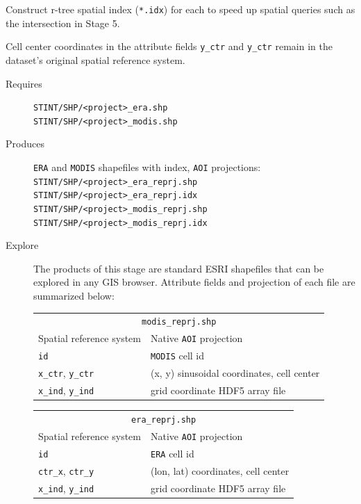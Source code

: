 \documentclass[twoside,a4paper]{refart}
\begin{document}
Construct r-tree spatial index (\texttt{*.idx}) for each to speed up spatial queries such as the intersection in Stage 5.

Cell center coordinates in the attribute fields \texttt{y\_ctr} and \texttt{y\_ctr} remain in the dataset's original spatial reference system.

  \begin{description}
    \item [Requires]
      \texttt{STINT/SHP/<project>\_era.shp}\\
      \texttt{STINT/SHP/<project>\_modis.shp}
  
    \item [Produces]
      \texttt{ERA} and \texttt{MODIS} shapefiles with index, 
      \texttt{AOI} projections:\\ 
      \texttt{STINT/SHP/<project>\_era\_reprj.shp}\\
      \texttt{STINT/SHP/<project>\_era\_reprj.idx}\\
      \texttt{STINT/SHP/<project>\_modis\_reprj.shp}\\
      \texttt{STINT/SHP/<project>\_modis\_reprj.idx}      
      

    \item [Explore]
      The products of this stage are standard ESRI shapefiles that can be explored in any GIS browser.  Attribute fields and projection of each file are summarized below:
      
\begin{tabular}{ll}
       \multicolumn{2}{c}{\texttt{modis\_reprj.shp}} \\
Spatial reference system        & Native \texttt{AOI} projection \\
\texttt{id}                     & \texttt{MODIS} cell id \\  
\texttt{x\_ctr}, \texttt{y\_ctr} & (x, y) sinusoidal coordinates, cell center \\
\texttt{x\_ind}, \texttt{y\_ind} & grid coordinate HDF5 array file\\
\end{tabular}
      
\begin{tabular}{ll}
       \multicolumn{2}{c}{ \texttt{era\_reprj.shp}} \\
Spatial reference system        & Native \texttt{AOI} projection \\
\texttt{id}                     & \texttt{ERA} cell id\\
\texttt{ctr\_x}, \texttt{ctr\_y} & (lon, lat) coordinates, cell center \\ 
\texttt{x\_ind}, \texttt{y\_ind} & grid coordinate HDF5 array file\\
\end{tabular}

  \end{description}
\end{document}
